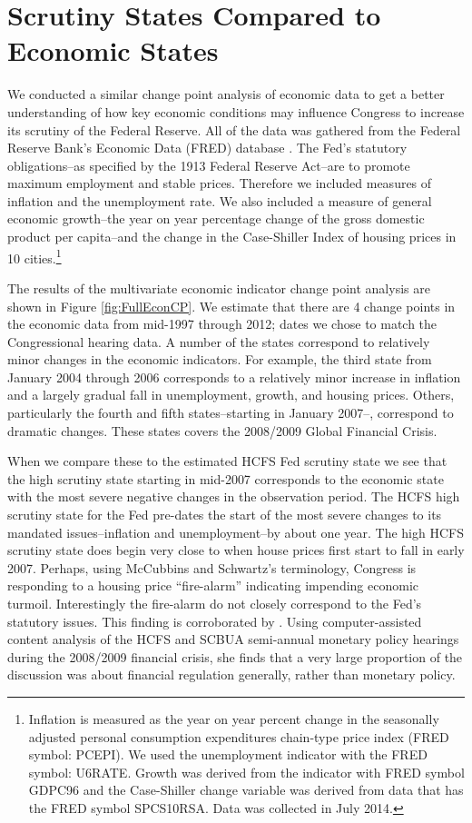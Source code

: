 \documentclass[a4paper]{article}\usepackage[]{graphicx}\usepackage[]{color}
\begin{document}
\section{Scrutiny States Compared to Economic States}

We conducted a similar change point analysis of economic data to get a better understanding of how key economic conditions may influence Congress to increase its scrutiny of the Federal Reserve. All of the data was gathered from the Federal Reserve Bank's Economic Data (FRED) database \citep{FRED}. The Fed's statutory obligations--as specified by the 1913 Federal Reserve Act--are to promote maximum employment and stable prices. Therefore we included measures of inflation and the unemployment rate. We also included a measure of general economic growth--the year on year percentage change of the gross domestic product per capita--and the change in the Case-Shiller Index of housing prices in 10 cities.\footnote{Inflation is measured as the year on year percent change in the seasonally adjusted personal consumption expenditures chain-type price index (FRED symbol: PCEPI). We used the unemployment indicator with the FRED symbol: U6RATE. Growth was derived from the indicator with FRED symbol GDPC96 and the Case-Shiller change variable was derived from data that has the FRED symbol SPCS10RSA. Data was collected in July 2014.}

The results of the multivariate economic indicator change point analysis are shown in Figure \ref{fig:FullEconCP}. We estimate that there are 4 change points in the economic data from mid-1997 through 2012; dates we chose to match the Congressional hearing data. A number of the states correspond to relatively minor changes in the economic indicators. For example, the third state from January 2004 through 2006 corresponds to a relatively minor increase in inflation and a largely gradual fall in unemployment, growth, and housing prices. Others, particularly the fourth and fifth states--starting in January 2007--, correspond to dramatic changes. These states covers the 2008/2009 Global Financial Crisis.

When we compare these to the estimated HCFS Fed scrutiny state we see that the high scrutiny state starting in mid-2007 corresponds to the economic state with the most severe negative changes in the observation period. The HCFS high scrutiny state for the Fed pre-dates the start of the most severe changes to its mandated issues--inflation and unemployment--by about one year. The high HCFS scrutiny state does begin very close to when house prices first start to fall in early 2007.  Perhaps, using McCubbins and Schwartz's \citeyearpar{Mccubbins1984} terminology, Congress is responding to a housing price ``fire-alarm'' indicating impending economic turmoil. Interestingly the fire-alarm do not closely correspond to the Fed's statutory issues. This finding is corroborated by \cite{SchonhardtBailey2012}. Using computer-assisted content analysis of the HCFS and SCBUA semi-annual monetary policy hearings during the 2008/2009 financial crisis, she finds that a very large proportion of the discussion was about financial regulation generally, rather than monetary policy.
\end{document}
